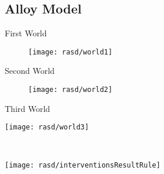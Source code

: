 	\subsection{Alloy Model}
		\begin{frame}{First World}
			\begin{figure}[hbtp]
				\centering
				\texttt{[image: rasd/world1]}
			\end{figure}
		\end{frame}
	
		\begin{frame}{Second World}
			\begin{figure}
				\centering
				\texttt{[image: rasd/world2]}
			\end{figure}
		\end{frame}
	
		\begin{frame}{Third World}
			\begin{minipage}{0.4\textwidth}
				\centering
				\texttt{[image: rasd/world3]}
			\end{minipage}\hspace{0.5cm}
			~
			\begin{minipage}{0.4\textwidth}
				\centering
				\texttt{[image: rasd/interventionsResultRule]}
			\end{minipage}
		\end{frame}